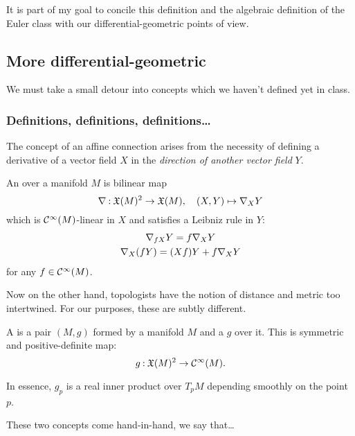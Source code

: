 \documentclass[12pt]{memoir}
\begin{document}
It is part of my goal to concile this definition and the algebraic definition of the Euler class with our differential-geometric points of view.

\subsection{More differential-geometric}
We must take a small detour into concepts which we haven't defined yet in class.

\subsubsection{Definitions, definitions, definitions\dots}

The concept of an affine connection arises from the necessity of defining a derivative of a vector field $X$ in the \emph{direction of another vector field} $Y$.

\begin{Def}
    An  over a manifold $M$ is bilinear map 
    $${\mathbf{\nabla}}\mathbin{:}\mathfrak{X}(M)^2\to\mathfrak{X}(M),\quad (X,Y)\mapsto {\mathbf{\nabla}}_XY$$
    which is $\mathcal{C}^\infty(M)$-linear in $X$ and satisfies a Leibniz rule in $Y$:
    \begin{gather*}
        {\mathbf{\nabla}}_{fX}Y=f{\mathbf{\nabla}}_XY\\
        {\mathbf{\nabla}}_{X}(fY)=(Xf)Y+f\nabla_XY\\
    \end{gather*}
    for any $f\in\mathcal{C}^\infty(M)$.
\end{Def}

Now on the other hand, topologists have the notion of distance and metric too intertwined. For our purposes, these are subtly different.

\begin{Def}
    A  is a pair $(M,g)$ formed by a manifold $M$ and a  $g$ over it. This is symmetric and positive-definite map:
    $$g\mathbin{:}\mathfrak{X}(M)^2\to\mathcal{C}^\infty(M).$$
\end{Def}

\begin{Rmk}
    In essence, $g_p$ is a real inner product over $T_pM$ depending smoothly on the point $p$.    
\end{Rmk}

These two concepts come hand-in-hand, we say that\dots
\end{document}
